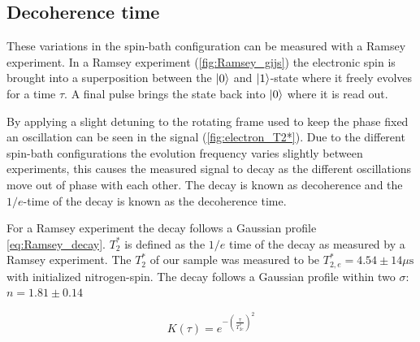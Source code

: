 \subsection{Decoherence time}
These variations in the spin-bath configuration can be measured with a Ramsey experiment.
In a Ramsey experiment (\cref{fig:Ramsey_gijs}) the electronic spin is brought into a superposition between the ${\left\vert{0}\right\rangle}$ and ${\left\vert{1}\right\rangle}$-state where it freely evolves for a time $\tau$.
A final pulse brings the state back into ${\left\vert{0}\right\rangle}$ where it is read out.

By applying a slight detuning to the rotating frame used to keep the phase fixed an oscillation can be seen in the signal (\cref{fig:electron_T2*}).
Due to the different spin-bath configurations the evolution frequency varies slightly between experiments, this causes the measured signal to decay as the different oscillations move out of phase with each other.
The decay is known as decoherence and the $1/e$-time of the decay is known as the decoherence time.

For a Ramsey experiment the decay follows a Gaussian profile \cref{eq:Ramsey_decay}.
$T_2^*$ is defined as the $1/e$ time of the decay as measured by a Ramsey experiment.
The $T_2^*$ of our sample was measured to be $T_{2,e}^* = 4.54 \pm 14 \mu\mathrm{s}$ with initialized nitrogen-spin.
The decay follows a Gaussian profile within two $\sigma$: $n = 1.81 \pm 0.14$

\begin{equation}
    K(\tau) = e^{-(\tfrac{\tau}{T_{2e}^*})^2}
    \label{eq:Ramsey_decay}
\end{equation}

